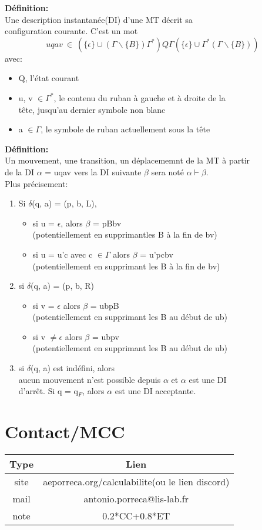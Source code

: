 \documentclass[12pt, a4paper, draft]{article}
\begin{document}
\textbf{Définition:}\\
Une description instantanée(DI) d'une MT décrit sa\\configuration courante.
C'est un mot
$$uqav~\in~(\{\epsilon\}\cup(\Gamma\backslash\{B\})\Gamma^*)Q\Gamma(\{\epsilon\}\cup\Gamma^*(\Gamma\backslash\{B\}))$$
avec:
\begin{itemize}
  \item Q, l'état courant
  \item u, v $\in\Gamma^*$, le contenu du ruban à gauche et à droite de la
  \\tête, jusqu'au dernier symbole non blanc
  \item a $\in\Gamma$, le symbole de ruban actuellement sous la tête
\end{itemize}

\textbf{Définition:}\\
Un mouvement, une transition, un déplacememnt de la MT à partir\\de la DI
$\alpha$ = uqav vers la DI suivante $\beta$ sera noté $\alpha\vdash\beta$.\\
Plus précisement:
\begin{enumerate}
  \item Si $\delta$(q, a) = (p, b, L),
  \begin{itemize}
    \item si u = $\epsilon$, alors $\beta$ = pBbv
    \\(potentiellement en supprimantles B à la fin de bv)
    \item si u = u'c avec c $\in\Gamma$ alors $\beta$ = u'pcbv
    \\(potentiellement en supprimant les B à la fin de bv)
  \end{itemize}
  \item si $\delta$(q, a) = (p, b, R)
  \begin{itemize}
    \item si v = $\epsilon$ alors $\beta$ = ubpB
    \\(potentiellement en supprimant les B au début de ub)
    \item si v $\neq\epsilon$ alors $\beta$ = ubpv
    \\(potentiellement en supprimant les B au début de ub)
  \end{itemize}
  \item si $\delta$(q, a) est indéfini, alors
  \\aucun mouvement n'est possible depuis $\alpha$ et $\alpha$ est une DI\\d'arrêt.
  Si q = q$_F$, alors $\alpha$ est une DI acceptante.
\end{enumerate}

\newpage

\section{Contact/MCC}

\begin{tabular}{|c|c|}
  \hline
  Type & Lien\\
  \hline
  site & aeporreca.org/calculabilite(ou le lien discord)\\
  mail & antonio.porreca@lis-lab.fr\\
  note & 0.2*CC+0.8*ET\\
  \hline
\end{tabular}
\end{document}
